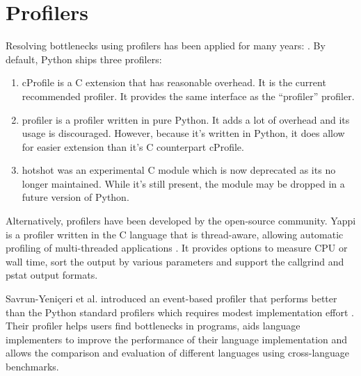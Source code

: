 \section{Profilers}
Resolving bottlenecks using profilers has been applied for many years: \cite{pesterev2010locating, gorelick2014high, fan2013performance}.
By default, Python ships three profilers:

\begin{enumerate}
	\item cProfile is a C extension that has reasonable overhead. It is the current recommended profiler. It provides the same interface as the ``profiler'' profiler.
	\item profiler is a profiler written in pure Python. It adds a lot of overhead and its usage is discouraged. However, because it's written in Python, it does allow for easier extension than it's C counterpart cProfile.
	\item hotshot was an experimental C module which is now deprecated as its no longer maintained. While it's still present, the module may be dropped in a future version of Python.
\end{enumerate}

Alternatively, profilers have been developed by the open-source community.
Yappi is a profiler written in the C language that is thread-aware, allowing automatic profiling of multi-threaded applications \cite{cip2014yet}.
It provides options to measure CPU or wall time, sort the output by various parameters and support the callgrind and pstat output formats.

Savrun-Yeni{\c{c}}eri et al. introduced an event-based profiler that performs better than the Python standard profilers which requires modest implementation effort \cite{savrun2015efficient}.
Their profiler helps users find bottlenecks in programs, aids language implementers to improve the performance of their language implementation and allows the comparison and evaluation of different languages using cross-language benchmarks.\\
